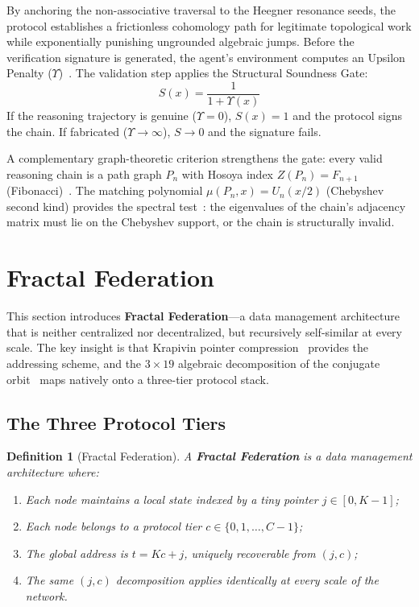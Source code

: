 \documentclass[12pt,a4paper]{article}
\newtheorem{definition}[theorem]{Definition}
\begin{document}
By anchoring the non-associative traversal to the Heegner resonance seeds, the protocol establishes a frictionless cohomology path for legitimate topological work while exponentially punishing ungrounded algebraic jumps. Before the verification signature is generated, the agent's environment computes an Upsilon Penalty ($\Upsilon$)~\cite{PP-I-Ch11}. The validation step applies the Structural Soundness Gate:
\begin{equation}
S(x) = \frac{1}{1 + \Upsilon(x)}
\end{equation}
If the reasoning trajectory is genuine ($\Upsilon = 0$), $S(x) = 1$ and the protocol signs the chain. If fabricated ($\Upsilon \to \infty$), $S \to 0$ and the signature fails.

A complementary graph-theoretic criterion strengthens the gate: every valid reasoning chain is a path graph $P_n$ with Hosoya index $Z(P_n) = F_{n+1}$ (Fibonacci)~\cite{hosoya1971}. The matching polynomial $\mu(P_n, x) = U_n(x/2)$ (Chebyshev second kind) provides the spectral test~\cite{kohmoto1983}: the eigenvalues of the chain's adjacency matrix must lie on the Chebyshev support, or the chain is structurally invalid.

\section{Fractal Federation}
\label{sec:fractal}

This section introduces \textbf{Fractal Federation}---a data management architecture that is neither centralized nor decentralized, but recursively self-similar at every scale. The key insight is that Krapivin pointer compression~\cite{krapivin2025optimal} provides the addressing scheme, and the $3 \times 19$ algebraic decomposition of the conjugate orbit~\cite{PP-I-Ch5} maps natively onto a three-tier protocol stack.

\subsection{The Three Protocol Tiers}

\begin{definition}[Fractal Federation]
A \textbf{Fractal Federation} is a data management architecture where:
\begin{enumerate}[noitemsep]
\item Each node maintains a local state indexed by a \emph{tiny pointer} $j \in [0, K-1]$;
\item Each node belongs to a \emph{protocol tier} $c \in \{0, 1, \ldots, C-1\}$;
\item The global address is $t = Kc + j$, uniquely recoverable from $(j, c)$;
\item The same $(j, c)$ decomposition applies identically at every scale of the network.
\end{enumerate}
\end{definition}
\end{document}
